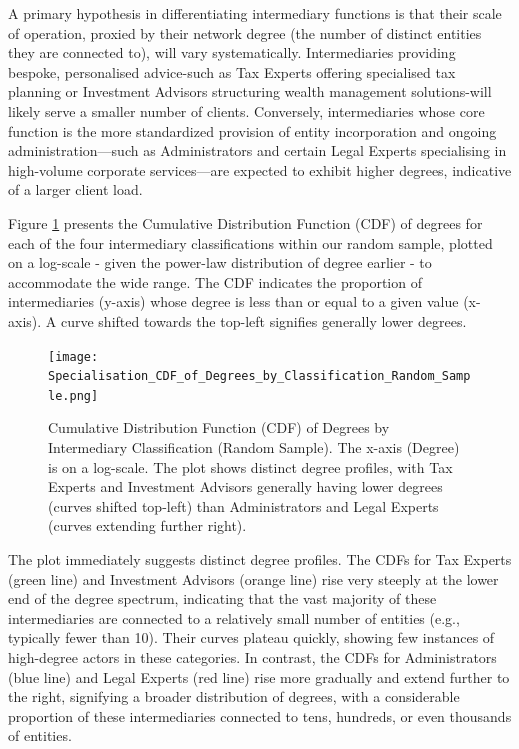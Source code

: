 A primary hypothesis in differentiating intermediary functions is that their scale of operation, proxied by their network degree (the number of distinct entities they are connected to), will vary systematically. Intermediaries providing bespoke, personalised advice-such as Tax Experts offering specialised tax planning or Investment Advisors structuring wealth management solutions-will likely serve a smaller number of clients. Conversely, intermediaries whose core function is the more standardized provision of entity incorporation and ongoing administration—such as Administrators and certain Legal Experts specialising in high-volume corporate services—are expected to exhibit higher degrees, indicative of a larger client load.

Figure \ref{fig:specialisation_cdf_degrees} presents the Cumulative Distribution Function (CDF) of degrees for each of the four intermediary classifications within our random sample, plotted on a log-scale - given the power-law distribution of degree earlier - to accommodate the wide range. The CDF indicates the proportion of intermediaries (y-axis) whose degree is less than or equal to a given value (x-axis). A curve shifted towards the top-left signifies generally lower degrees.

\begin{figure}[htbp]
    \centering
    \texttt{[image: Specialisation\_CDF\_of\_Degrees\_by\_Classification\_Random\_Sample.png]}
    \caption{Cumulative Distribution Function (CDF) of Degrees by Intermediary Classification (Random Sample). The x-axis (Degree) is on a log-scale. The plot shows distinct degree profiles, with Tax Experts and Investment Advisors generally having lower degrees (curves shifted top-left) than Administrators and Legal Experts (curves extending further right).}
    \label{fig:specialisation_cdf_degrees}
\end{figure}

The plot immediately suggests distinct degree profiles. The CDFs for Tax Experts (green line) and Investment Advisors (orange line) rise very steeply at the lower end of the degree spectrum, indicating that the vast majority of these intermediaries are connected to a relatively small number of entities (e.g., typically fewer than 10). Their curves plateau quickly, showing few instances of high-degree actors in these categories. In contrast, the CDFs for Administrators (blue line) and Legal Experts (red line) rise more gradually and extend further to the right, signifying a broader distribution of degrees, with a considerable proportion of these intermediaries connected to tens, hundreds, or even thousands of entities.

